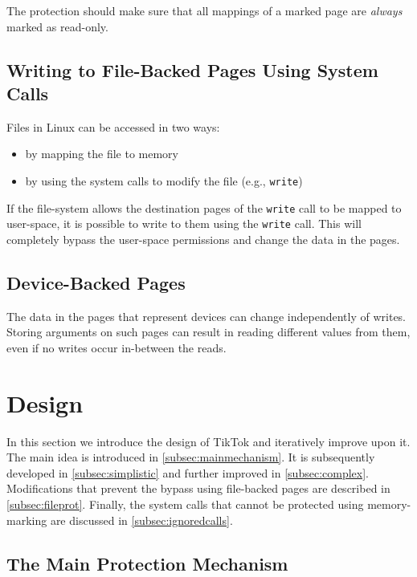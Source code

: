 \documentclass[conference]{IEEEtran}
\newcommand{\sysname}{TikTok}
\begin{document}
The protection should make sure that all mappings of a marked page are \emph{always}
marked as read-only.

\subsection{Writing to File-Backed Pages Using System Calls}

Files in Linux can be accessed in two ways:
\begin{itemize}
    \item by mapping the file to memory
    \item by using the system calls to modify the file (e.g., \texttt{write})
\end{itemize}

If the file-system allows the destination pages of the \texttt{write} call to be
mapped to user-space, it is possible to write to them using the \texttt{write}
call. This will completely bypass the user-space permissions and change the data
in the pages.

\subsection{Device-Backed Pages}

The data in the pages that represent devices can change independently of writes.
Storing arguments on such pages can result in reading different values from them,
even if no writes occur in-between the reads.

\section{Design}
\label{sec:design}

In this section we introduce the design of \sysname{} and iteratively improve
upon it. The main idea is introduced in \autoref{subsec:mainmechanism}. It is
subsequently developed in \autoref{subsec:simplistic} and further improved in
\autoref{subsec:complex}. Modifications that prevent the bypass using
file-backed pages are described in \autoref{subsec:fileprot}. Finally, the
system calls that cannot be protected using memory-marking are discussed in
\autoref{subsec:ignoredcalls}.

\subsection{The Main Protection Mechanism}
\label{subsec:mainmechanism}
\end{document}
